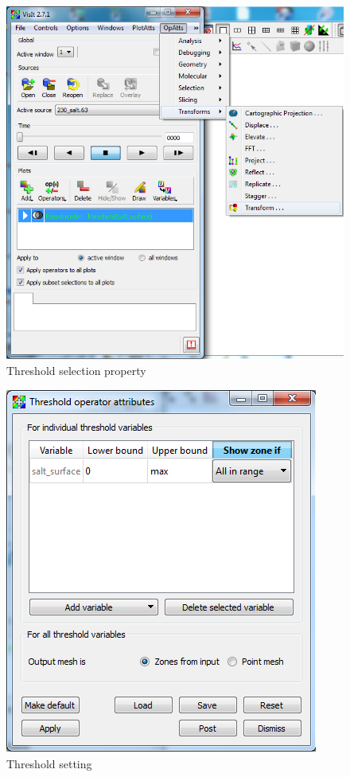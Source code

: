 \documentclass[12pt]{report}
\begin{document}
        \begin{figure}
        \begin{center}
        \includegraphics{thresholdSelectionProp}
        \caption{Threshold selection property }
        \label{figure:thresholdSelectionProp}
        \end{center}
        \end{figure} 
        
        \begin{figure}
        \begin{center}
        \includegraphics{thresholdSelectionPropSet}
        \caption{Threshold setting }
        \label{figure:thresholdSelectionPropSet}
        \end{center}
        \end{figure} 
\end{document}
